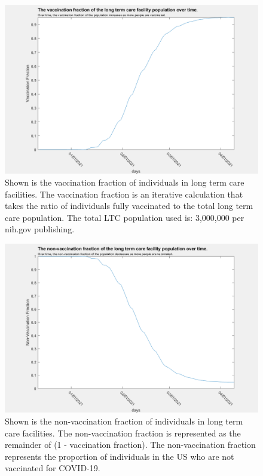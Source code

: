 \documentclass[twoside]{article}
\begin{document}
\begin{multicols}{2}
\begin{figure}[H]
	\includegraphics[width=\linewidth]{images/vac_fraction_LTC.png}
	\caption{Shown is the vaccination fraction of individuals in long term care facilities. The vaccination fraction is an iterative calculation that takes the ratio of individuals fully vaccinated to the total long term care population. The total LTC population used is: 3,000,000 per nih.gov publishing.  }
	\label{fig:images/vac_fraction_LTCLabel}
\end{figure}

\begin{figure}[H]
	\includegraphics[width=\linewidth]{images/non_vac_fraction_LTC.png}
	\caption{Shown is the non-vaccination fraction of individuals in long term care facilities. The non-vaccination fraction is represented as the remainder of (1 - vaccination fraction). The non-vaccination fraction represents the proportion of individuals in the US who are not vaccinated for COVID-19.}
	\label{fig:images/non_vac_fraction_LTCLabel}
\end{figure}


\end{multicols}
\end{document}
